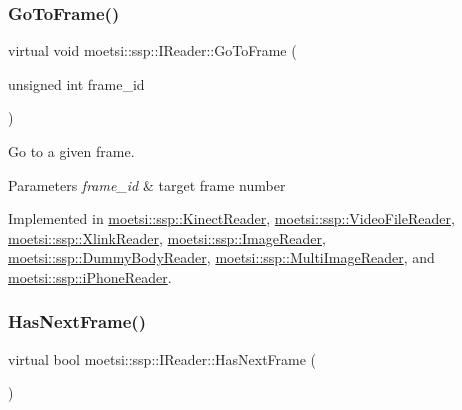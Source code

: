 \subsubsection{\texorpdfstring{Go\+To\+Frame()}{GoToFrame()}\hspace{0.1cm}{\footnotesize\ttfamily [2/2]}}
{\footnotesize\ttfamily virtual void moetsi\+::ssp\+::\+I\+Reader\+::\+Go\+To\+Frame (\begin{DoxyParamCaption}\item[{unsigned int}]{frame\+\_\+id }\end{DoxyParamCaption})\hspace{0.3cm}{\ttfamily [pure virtual]}}



Go to a given frame. 


\begin{DoxyParams}{Parameters}
{\em frame\+\_\+id} & target frame number \\
\hline
\end{DoxyParams}


Implemented in \hyperlink{classmoetsi_1_1ssp_1_1KinectReader_a315690c46e153a35d4ded1189e93af08}{moetsi\+::ssp\+::\+Kinect\+Reader}, \hyperlink{classmoetsi_1_1ssp_1_1VideoFileReader_ad98a532db8b1e2c3879df274b2efb082}{moetsi\+::ssp\+::\+Video\+File\+Reader}, \hyperlink{classmoetsi_1_1ssp_1_1XlinkReader_af540d074aeb4d3075db45c246fd48627}{moetsi\+::ssp\+::\+Xlink\+Reader}, \hyperlink{classmoetsi_1_1ssp_1_1ImageReader_a32eb88cc612e6920f4910e0803b0ce3c}{moetsi\+::ssp\+::\+Image\+Reader}, \hyperlink{classmoetsi_1_1ssp_1_1DummyBodyReader_a61e495deb7314560d5e17388f6b6938f}{moetsi\+::ssp\+::\+Dummy\+Body\+Reader}, \hyperlink{classmoetsi_1_1ssp_1_1MultiImageReader_a7c552a1ad469660ea0a88b9ca85138ad}{moetsi\+::ssp\+::\+Multi\+Image\+Reader}, and \hyperlink{classmoetsi_1_1ssp_1_1iPhoneReader_a27b6dea97e4c4db8e4e749cc9e30e7ca}{moetsi\+::ssp\+::i\+Phone\+Reader}.

\mbox{\label{classmoetsi_1_1ssp_1_1IReader_af9186ba41e136dc4ec3242b5dd55fa04}} 
\subsubsection{\texorpdfstring{Has\+Next\+Frame()}{HasNextFrame()}\hspace{0.1cm}{\footnotesize\ttfamily [1/2]}}
{\footnotesize\ttfamily virtual bool moetsi\+::ssp\+::\+I\+Reader\+::\+Has\+Next\+Frame (\begin{DoxyParamCaption}{ }\end{DoxyParamCaption})\hspace{0.3cm}{\ttfamily [pure virtual]}}



